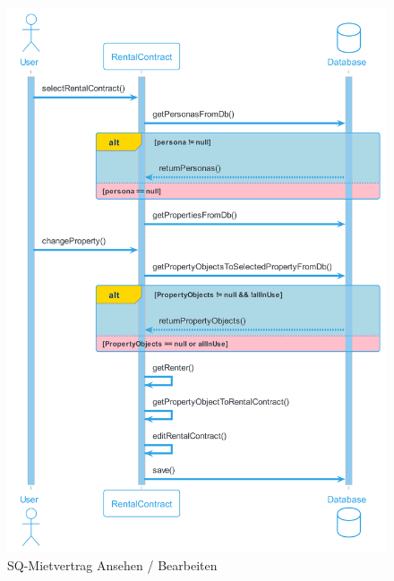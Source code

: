 \begin{figure}[H]
  \begin{center}
    \includegraphics[width=0.6\textheight]{content/diagrams/out/sequenzdiagram/mietvertragEditieren/mietvertragEditieren.png}
    \caption{SQ-Mietvertrag Ansehen / Bearbeiten}

  \end{center}
\end{figure}

